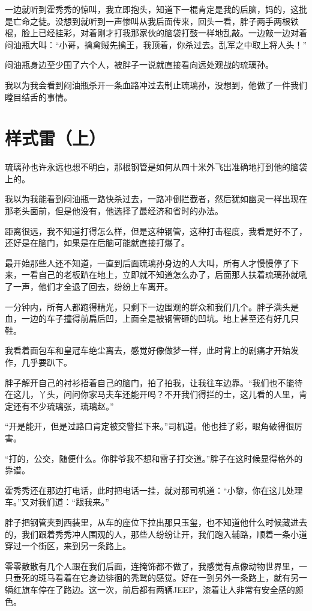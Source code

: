 一边就听到霍秀秀的惊叫，我立即抱头，知道下一棍肯定是我的后脑，妈的，这批是亡命之徒。没想到就听到一声惨叫从我后面传来，回头一看，胖子两手两根铁棍，脸上已经挂彩，对着刚才打我那家伙的脑袋打鼓一样地乱敲。一边敲一边对着闷油瓶大叫：“小哥，擒禽贼先擒王，我顶着，你杀过去。乱军之中取上将人头！”

闷油瓶身边至少围了六个人，被胖子一说就直接看向远处观战的琉璃孙。

我以为我会看到闷油瓶杀开一条血路冲过去制止琉璃孙，没想到，他做了一件我们瞠目结舌的事情。

\chapter{样式雷（上）}

琉璃孙也许永远也想不明白，那根钢管是如何从四十米外飞出准确地打到他的脑袋上的。

我以为我能看到闷油瓶一路快杀过去，一路冲倒拦截者，然后犹如幽灵一样出现在那老头面前，但是他没有，他选择了最经济和省时的办法。

距离很远，我不知道打得怎么样，但是这种钢管，这种打击程度，我看是好不了，还好是在脑门，如果是在后脑可能就直接打爆了。

最开始那些人还不知道，一直到后面琉璃孙身边的人大叫，所有人才慢慢停了下来，一看自己的老板趴在地上，立即就不知道怎么办了，后面那人扶着琉璃孙就吼了一声，他们才全退了回去，纷纷上车离开。

一分钟内，所有人都跑得精光，只剩下一边围观的群众和我们几个。胖子满头是血，一边的车子撞得前扁后凹，上面全是被钢管砸的凹坑。地上甚至还有好几只鞋。

我看着面包车和皇冠车绝尘离去，感觉好像做梦一样，此时背上的剧痛才开始发作，几乎要趴下。

胖子解开自己的衬衫捂着自己的脑门，拍了拍我，让我往车边靠。“我们也不能待在这儿，丫头，问问你家马夫车还能开吗？不开我们得拦的士，这儿看的人里，肯定还有不少琉璃张，琉璃赵。”

“开是能开，但是过路口肯定被交警拦下来。”司机道。他也挂了彩，眼角破得很厉害。

“打的，公交，随便什么。你胖爷我不想和雷子打交道。”胖子在这时候显得格外的靠谱。

霍秀秀还在那边打电话，此时把电话一挂，就对那司机道：“小黎，你在这儿处理车。”又对我们道：“跟我来。”

胖子把钢管夹到西装里，从车的座位下拉出那只玉玺，也不知道他什么时候藏进去的，我们跟着秀秀冲人围观的人，那些人纷纷让开，我们跑入辅路，顺着一条小道穿过一个街区，来到另一条路上。

零零散散有几个人跟在我们后面，连掩饰都不做了，我感觉有点像动物世界里，一只垂死的斑马看着在它身边徘徊的秃鹫的感觉。好在一到另外一条路上，就有另一辆红旗车停在了路边。这一次，前后都有两辆JEEP，漆着让人非常有安全感的颜色。

